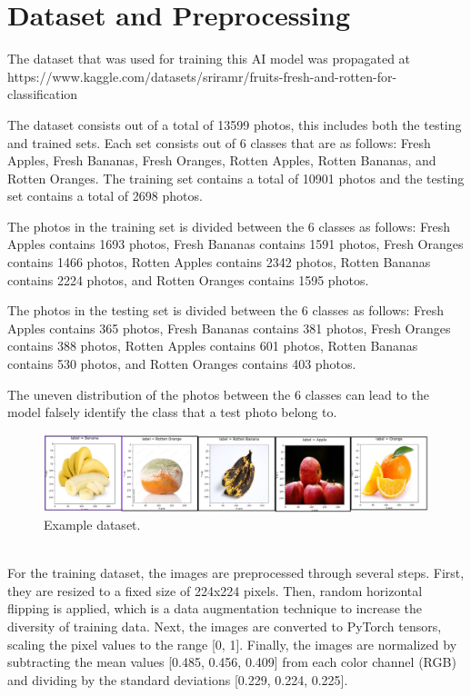 \documentclass[conference]{IEEEtran}
\begin{document}
\section{Dataset and Preprocessing}

The dataset that was used for training this AI model was propagated at https://www.kaggle.com/datasets/sriramr/fruits-fresh-and-rotten-for-classification

The dataset consists out of a total of 13599 photos, this includes both the testing and trained sets. Each set consists out of 6 classes that are as follows: Fresh Apples, Fresh Bananas, Fresh Oranges, Rotten Apples, Rotten Bananas, and Rotten Oranges. The training set contains a total of 10901 photos and the testing set contains a total of 2698 photos.

The photos in the training set is divided between the 6 classes as follows: Fresh Apples contains 1693 photos, Fresh Bananas contains 1591 photos, Fresh Oranges contains 1466 photos, Rotten Apples contains 2342 photos, Rotten Bananas contains 2224 photos, and Rotten Oranges contains 1595 photos.

The photos in the testing set is divided between the 6 classes as follows: Fresh Apples contains 365 photos, Fresh Bananas contains 381 photos, Fresh Oranges contains 388 photos, Rotten Apples contains 601 photos, Rotten Bananas contains 530 photos, and Rotten Oranges contains 403 photos.

The uneven distribution of the photos between the 6 classes can lead to the model falsely identify the class that a test photo belong to.
\begin{figure}[h]
    \centering
    \includegraphics[width=\linewidth]{Example data.png}
    \caption{Example dataset.}
    \label{fig}
\end{figure}
\\
For the training dataset, the images are preprocessed through several steps. First, they are resized to a fixed size of 224x224 pixels. Then, random horizontal flipping is applied, which is a data augmentation technique to increase the diversity of training data. Next, the images are converted to PyTorch tensors, scaling the pixel values to the range [0, 1]. Finally, the images are normalized by subtracting the mean values [0.485, 0.456, 0.409] from each color channel (RGB) and dividing by the standard deviations [0.229, 0.224, 0.225].
\end{document}
